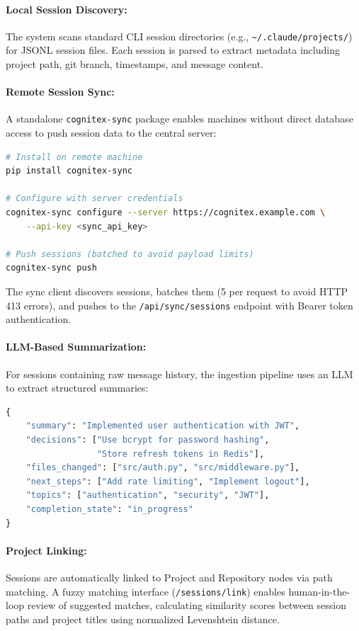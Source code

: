 \documentclass[11pt,a4paper]{article}
\begin{document}
\paragraph{Local Session Discovery:} The system scans standard CLI session directories (e.g., \texttt{\textasciitilde/.claude/projects/}) for JSONL session files. Each session is parsed to extract metadata including project path, git branch, timestamps, and message content.

\paragraph{Remote Session Sync:} A standalone \texttt{cognitex-sync} package enables machines without direct database access to push session data to the central server:

\begin{lstlisting}[language=bash]
# Install on remote machine
pip install cognitex-sync

# Configure with server credentials
cognitex-sync configure --server https://cognitex.example.com \
    --api-key <sync_api_key>

# Push sessions (batched to avoid payload limits)
cognitex-sync push
\end{lstlisting}

The sync client discovers sessions, batches them (5 per request to avoid HTTP 413 errors), and pushes to the \texttt{/api/sync/sessions} endpoint with Bearer token authentication.

\paragraph{LLM-Based Summarization:} For sessions containing raw message history, the ingestion pipeline uses an LLM to extract structured summaries:

\begin{lstlisting}[language=Python]
{
    "summary": "Implemented user authentication with JWT",
    "decisions": ["Use bcrypt for password hashing",
                  "Store refresh tokens in Redis"],
    "files_changed": ["src/auth.py", "src/middleware.py"],
    "next_steps": ["Add rate limiting", "Implement logout"],
    "topics": ["authentication", "security", "JWT"],
    "completion_state": "in_progress"
}
\end{lstlisting}

\paragraph{Project Linking:} Sessions are automatically linked to Project and Repository nodes via path matching. A fuzzy matching interface (\texttt{/sessions/link}) enables human-in-the-loop review of suggested matches, calculating similarity scores between session paths and project titles using normalized Levenshtein distance.
\end{document}

